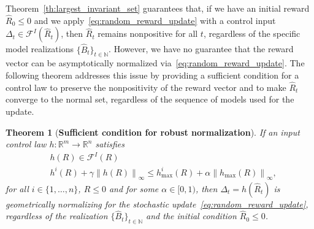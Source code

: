 \documentclass[10pt,leqno]{amsart}
\newcommand{\sml}{\scriptscriptstyle}
\newcommand{\norm}[1]{\left \|#1 \right \|}
\newcommand{\R}{\mathbb{R}}
\newcommand{\N}{\mathbb{N}}
\newcommand{\Cost}{R}
\newcommand{\disc}{\gamma}
\newcommand{\invset}[1]{\mathcal{F}^{\sml I}(#1)}
\newcommand{\infnorm}[1]{\norm{#1}_\infty}
\newcommand{\outmap}{h_{\sml \text{max}}}
\newcommand{\Bapx}{\hat{B}}
\newcommand{\Costpert}{\hat{\Cost}}
\newtheorem{theorem}{Theorem}[]
\begin{document}
\noindent Theorem~\ref{th:largest_invariant_set} guarantees that, if we have an initial reward $\Costpert_0 \leq 0$ and we apply~\eqref{eq:random_reward_update} with a control input $\Delta_t \in \invset{\Costpert_t}$, then $\Costpert_t$ remains nonpositive for all $t$, regardless of the specific model realizations $\{\Bapx_t\}_{t \in \N}$. However, we have no guarantee that the reward vector can be asymptotically normalized via~\eqref{eq:random_reward_update}. The following theorem addresses this issue by providing a sufficient condition for a control law to preserve the nonpositivity of the reward vector and to make $\Costpert_t$ converge to the normal set, regardless of the sequence of models used for the update.
\begin{theorem}[\textbf{Sufficient condition for robust normalization}]\label{th:sufficient_condition_for_robust_normalization}
    If an input control law $h : \R^m \to \R^n$ satisfies
    \begin{subequations}\label{eq:suff_cond_normalization_stochastic}
        \begin{align}
            &h(\Cost) \in \invset{\Cost}\label{eq:suff_cond_normalization_stochastic_1}\\
            &h^i(\Cost) + \disc \infnorm{h(\Cost)} \leq \outmap^i(\Cost) + \alpha \infnorm{\outmap(\Cost)}, \label{eq:suff_cond_normalization_stochastic_2}
        \end{align}
    \end{subequations}
    for all $i \in \{1, \hdots, n\}$, $\Cost \leq 0$ and for some $\alpha \in [0, 1)$, then $\Delta_t = h(\Costpert_t)$ is geometrically normalizing for the stochastic update~\eqref{eq:random_reward_update}, regardless of the realization $\{\Bapx_t\}_{t \in \N}$ and the initial condition $\Costpert_0 \leq 0$.
\end{theorem}
\end{document}
